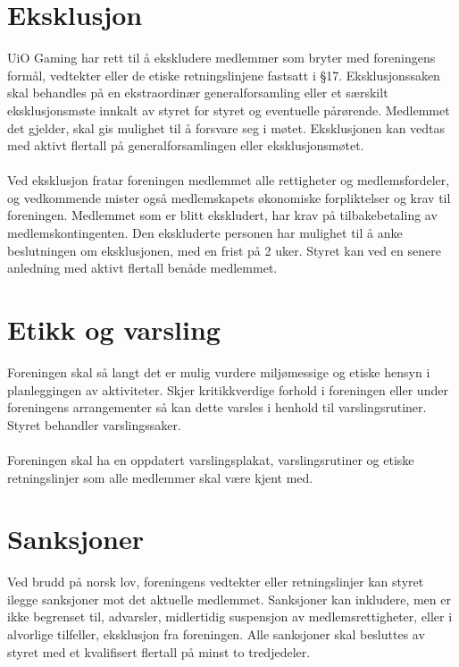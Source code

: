\documentclass[12pt,a4paper,norsk]{article}
\begin{document}
\section{Eksklusjon}

UiO Gaming har rett til å ekskludere medlemmer som bryter med foreningens formål, vedtekter eller de etiske retningslinjene fastsatt i §17. Eksklusjonssaken skal behandles på en ekstraordinær generalforsamling eller et særskilt eksklusjonsmøte innkalt av styret for styret og eventuelle pårørende. Medlemmet det gjelder, skal gis mulighet til å forsvare seg i møtet. Eksklusjonen kan vedtas med  aktivt flertall på generalforsamlingen eller eksklusjonsmøtet. 
\\
\\
Ved eksklusjon fratar foreningen medlemmet alle rettigheter og medlemsfordeler, og vedkommende mister også medlemskapets økonomiske forpliktelser og krav til foreningen. Medlemmet som er blitt ekskludert, har krav på tilbakebetaling av medlemskontingenten. Den ekskluderte personen har mulighet til å anke beslutningen om eksklusjonen, med en frist på 2 uker. Styret kan ved en senere anledning med  aktivt flertall benåde medlemmet.



\section{Etikk og varsling}

Foreningen skal så langt det er mulig vurdere miljømessige og etiske hensyn i planleggingen av aktiviteter. Skjer kritikkverdige forhold i foreningen eller under foreningens arrangementer så kan dette varsles i henhold til varslingsrutiner. Styret behandler varslingssaker.
\\
\\
Foreningen skal ha en oppdatert varslingsplakat, varslingsrutiner og etiske retningslinjer som alle medlemmer skal være kjent med.



\section{Sanksjoner}

Ved brudd på norsk lov, foreningens vedtekter eller retningslinjer kan styret ilegge sanksjoner mot det aktuelle medlemmet. Sanksjoner kan inkludere, men er ikke begrenset til, advarsler, midlertidig suspensjon av medlemsrettigheter, eller i alvorlige tilfeller, eksklusjon fra foreningen. Alle sanksjoner skal besluttes av styret med et kvalifisert flertall på minst to tredjedeler.
\end{document}
